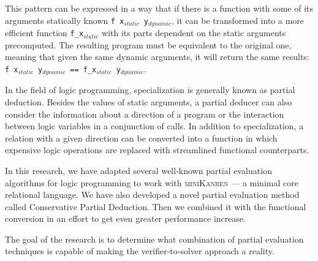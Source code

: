 This pattern can be expressed in a way that if there is a function with some of its arguments statically known \texttt{f x$_{static}$ y$_{dynamic}$}, it can be transformed into a more efficient function \texttt{f\_x$_{static}$} with its parts dependent on the static arguments precomputed.
The resulting program must be equivalent to the original one, meaning that given the same dynamic arguments, it will return the same results: \texttt{f x$_{static}$ y$_{dynamic}$ == f\_x$_{static}$ y$_{dynamic}$}.

In the field of logic programming, specialization is generally known as partial deduction. 
Besides the values of static arguments, a partial deducer can also consider the information about a direction of a program or the interaction between logic variables in a conjunction of calls. 
In addition to specialization, a relation with a given direction can be converted into a function in which expensive logic operations are replaced with streamlined functional counterparts. 


In this research, we have adapted several well-known partial evaluation algorithms for logic programming to work with \textsc{miniKanren} --- a minimal core relational language. 
We have also developed a novel partial evaluation method called Conservative Partial Deduction.
Then we combined it with the functional conversion in an effort to get even greater performance increase. 

The goal of the research is to determine what combination of partial evaluation techniques is capable of making the verifier-to-solver approach a reality. 






